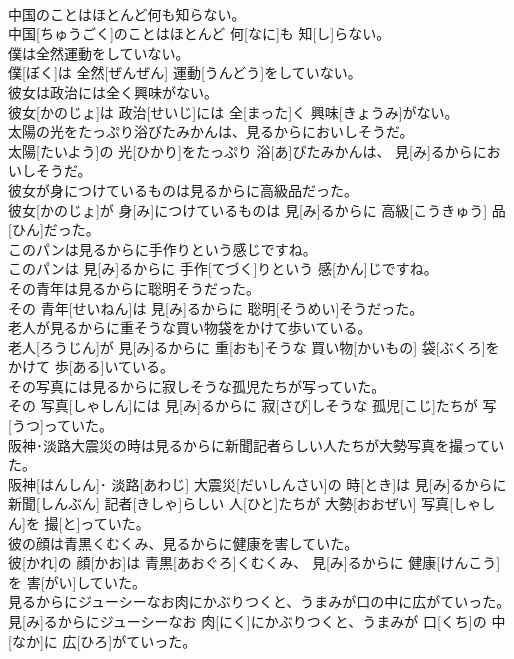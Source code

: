 \documentclass[8pt]{extreport}
\begin{document}
\begin{CJK}{UTF8}{min}
\\	中国のことはほとんど何も知らない。	
\\	中国[ちゅうごく]のことはほとんど 何[なに]も 知[し]らない。
\\	僕は全然運動をしていない。	
\\	僕[ぼく]は 全然[ぜんぜん] 運動[うんどう]をしていない。
\\	彼女は政治には全く興味がない。	
\\	彼女[かのじょ]は 政治[せいじ]には 全[まった]く 興味[きょうみ]がない。
\\	太陽の光をたっぷり浴びたみかんは、見るからにおいしそうだ。	
\\	太陽[たいよう]の 光[ひかり]をたっぷり 浴[あ]びたみかんは、 見[み]るからにおいしそうだ。
\\	彼女が身につけているものは見るからに高級品だった。	
\\	彼女[かのじょ]が 身[み]につけているものは 見[み]るからに 高級[こうきゅう] 品[ひん]だった。
\\	このパンは見るからに手作りという感じですね。	
\\	このパンは 見[み]るからに 手作[てづく]りという 感[かん]じですね。
\\	その青年は見るからに聡明そうだった。	
\\	その 青年[せいねん]は 見[み]るからに 聡明[そうめい]そうだった。
\\	老人が見るからに重そうな買い物袋をかけて歩いている。	
\\	老人[ろうじん]が 見[み]るからに 重[おも]そうな 買い物[かいもの] 袋[ぶくろ]をかけて 歩[ある]いている。
\\	その写真には見るからに寂しそうな孤児たちが写っていた。	
\\	その 写真[しゃしん]には 見[み]るからに 寂[さび]しそうな 孤児[こじ]たちが 写[うつ]っていた。
\\	阪神･淡路大震災の時は見るからに新聞記者らしい人たちが大勢写真を撮っていた。	
\\	阪神[はんしん]･ 淡路[あわじ] 大震災[だいしんさい]の 時[とき]は 見[み]るからに 新聞[しんぶん] 記者[きしゃ]らしい 人[ひと]たちが 大勢[おおぜい] 写真[しゃしん]を 撮[と]っていた。
\\	彼の顔は青黒くむくみ、見るからに健康を害していた。	
\\	彼[かれ]の 顔[かお]は 青黒[あおぐろ]くむくみ、 見[み]るからに 健康[けんこう]を 害[がい]していた。
\\	見るからにジューシーなお肉にかぶりつくと、うまみが口の中に広がていった。	
\\	見[み]るからにジューシーなお 肉[にく]にかぶりつくと、うまみが 口[くち]の 中[なか]に 広[ひろ]がていった。

\end{CJK}
\end{document}
